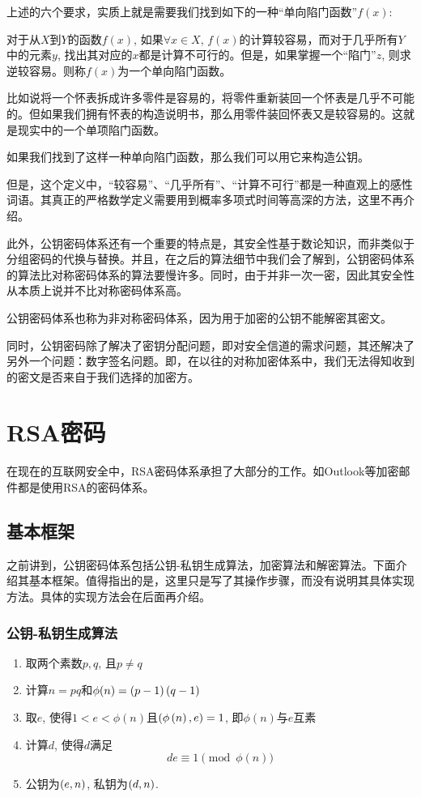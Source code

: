 上述的六个要求，实质上就是需要我们找到如下的一种“单向陷门函数”$f(x)$:\par
对于从$X$到$Y$的函数$f(x)$, 如果$\forall x\in X$, $f(x)$的计算较容易，而对于几乎所有$Y$中的元素$y$, 找出其对应的$x$都是计算不可行的。但是，如果掌握一个“陷门”$z$, 则求逆较容易。则称$f(x)$为一个单向陷门函数。\par
比如说将一个怀表拆成许多零件是容易的，将零件重新装回一个怀表是几乎不可能的。但如果我们拥有怀表的构造说明书，那么用零件装回怀表又是较容易的。这就是现实中的一个单项陷门函数。\par
如果我们找到了这样一种单向陷门函数，那么我们可以用它来构造公钥。\par
但是，这个定义中，“较容易”、“几乎所有”、“计算不可行”都是一种直观上的感性词语。其真正的严格数学定义需要用到概率多项式时间等高深的方法，这里不再介绍。\par
此外，公钥密码体系还有一个重要的特点是，其安全性基于数论知识，而非类似于分组密码的代换与替换。并且，在之后的算法细节中我们会了解到，公钥密码体系的算法比对称密码体系的算法要慢许多。同时，由于并非一次一密，因此其安全性从本质上说并不比对称密码体系高。\par
公钥密码体系也称为非对称密码体系，因为用于加密的公钥不能解密其密文。\par
同时，公钥密码除了解决了密钥分配问题，即对安全信道的需求问题，其还解决了另外一个问题：数字签名问题。即，在以往的对称加密体系中，我们无法得知收到的密文是否来自于我们选择的加密方。
\section{RSA密码}
在现在的互联网安全中，RSA密码体系承担了大部分的工作。如Outlook等加密邮件都是使用RSA的密码体系。
\subsection{基本框架}
之前讲到，公钥密码体系包括公钥-私钥生成算法，加密算法和解密算法。下面介绍其基本框架。值得指出的是，这里只是写了其操作步骤，而没有说明其具体实现方法。具体的实现方法会在后面再介绍。
\subsubsection{公钥-私钥生成算法}
\begin{enumerate}
\item 取两个素数$p, q$, 且$p\neq q$
\item 计算$n=pq$和$\phi(n)=\left( {p-1}\right)\left( {q-1}\right)$
\item 取$e$, 使得$1<e<\phi(n)$且$\left( {\phi\left( {n}\right), e}\right)=1$, 即$\phi(n)$与$e$互素
\item 计算$d$, 使得$d$满足
\begin{equation}
de\equiv 1\pmod{\phi(n)}
\end{equation}
\item 公钥为$\left( {e, n}\right)$, 私钥为$\left( {d, n}\right)$.
\end{enumerate}
